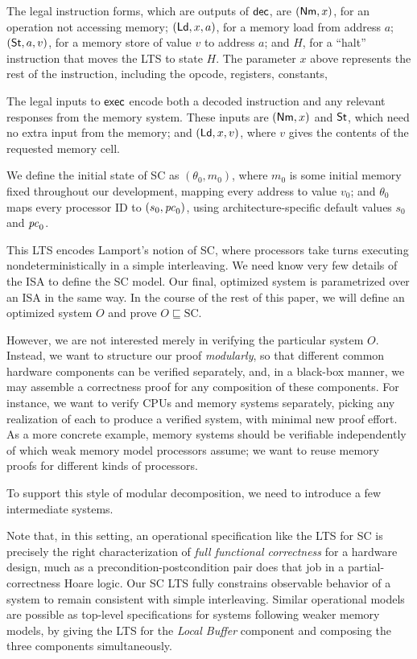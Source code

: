 The legal instruction forms, which are outputs of $\mathsf{dec}$, are $(\mathsf{Nm}, x)$, for
an operation not accessing memory; $(\mathsf{Ld}, x, a)$, for a memory load from
address $a$; $(\mathsf{St}, a, v)$, for a memory store of value $v$ to address $a$; and
$H$, for a ``halt'' instruction that moves the LTS to state $H$. The parameter
$x$ above represents the rest of the instruction, including the
opcode, registers, constants, \etc{}

The legal inputs to $\mathsf{exec}$ encode both a decoded instruction and any relevant
responses from the memory system.  These inputs are $(\mathsf{Nm}, x)$ and $\mathsf{St}$, which
need no extra input from the memory; and $(\mathsf{Ld}, x, v)$, where $v$ gives the
contents of the requested memory cell.

We define the initial state of SC as $(\theta_0, m_0)$, where $m_0$ is
some initial memory fixed throughout our development, mapping every
address to value $v_0$; and $\theta_0$ maps every processor ID to
$(s_0, \mathit{pc}_0)$, using architecture-specific default values $s_0$ and
$\mathit{pc}_0$.

\medskip

This LTS encodes Lamport's notion of SC, where processors take turns executing
nondeterministically in a simple interleaving.  We need know very few details
of the ISA to define the SC model.  Our final, optimized system is parametrized
over an ISA in the same way.  In the course of the rest of this paper, we will
define an optimized system $O$ and prove $O \sqsubseteq \text{SC}$.

However, we are not interested merely in verifying the particular system $O$.
Instead, we want to structure our proof \emph{modularly}, so that different
common hardware components can be verified separately, and, in a black-box
manner, we may assemble a correctness proof for any composition of these
components.  For instance, we want to verify CPUs and memory systems
separately, picking any realization of each to produce a verified system, with
minimal new proof effort. As a more concrete example, memory systems should be
verifiable independently of which weak memory model processors assume; we want
to reuse memory proofs for different kinds of processors.

To support this style of modular decomposition, we need to introduce a few
intermediate systems.

Note that, in this setting, an operational specification like the LTS
for SC is precisely the right characterization of \emph{full functional
  correctness} for a hardware design, much as a
precondition-postcondition pair does that job in a partial-correctness
Hoare logic.  Our SC LTS fully constrains observable behavior of a
system to remain consistent with simple interleaving.  Similar
operational models are possible as top-level specifications for
systems following weaker memory models, by giving the LTS for the \emph{Local
Buffer} component and composing the three components simultaneously.

